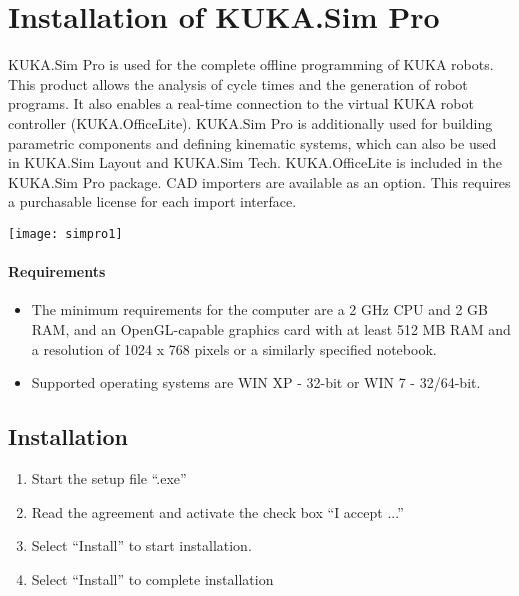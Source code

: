 	\newpage
	\section{Installation of KUKA.Sim Pro}
	KUKA.Sim Pro is used for the complete offline programming of KUKA robots. This product allows the analysis of cycle times and the generation of robot programs. It also enables a real-time connection to the virtual KUKA robot controller (KUKA.OfficeLite). KUKA.Sim Pro is additionally used for building parametric components and defining kinematic systems, which can also be used in KUKA.Sim Layout and KUKA.Sim Tech. KUKA.OfficeLite is included in the KUKA.Sim Pro package. CAD importers are available as an option. This requires a purchasable license for each import interface. 
	


	\begin{center}
        \texttt{[image: simpro1]}
	\end{center}
	 
	 \paragraph{Requirements}
	 	\begin{itemize}
	 	\item The minimum requirements for the computer are a 2 GHz CPU and 2 GB RAM, and an OpenGL-capable graphics card with at least 512 MB RAM and a resolution of 1024 x 768 pixels or a similarly specified notebook.
	 	\item Supported operating systems are WIN XP - 32-bit or WIN 7 - 32/64-bit.
	 \end{itemize}
 
 	\subsection{Installation}
 		\begin{enumerate}
 			\item Start the setup file “.exe”
 			\item Read the agreement and activate the check box “I accept ...”
 			\item Select “Install” to start installation.
 			\item Select “Install” to complete installation
 		\end{enumerate}
 	
